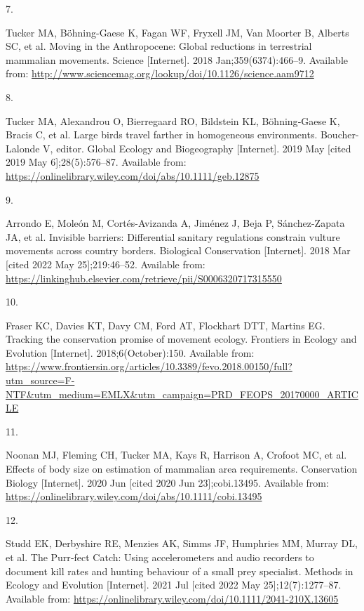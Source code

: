 \documentclass[10pt,a4paper]{article}
\newlength{\cslhangindent}
\newlength{\csllabelwidth}
\newenvironment{CSLReferences}[2] %
{\begin{list}{}{%
	\setlength{\itemindent}{0pt}
	\setlength{\leftmargin}{0pt}
	\setlength{\parsep}{0pt}
	\ifodd #1
	\setlength{\leftmargin}{\cslhangindent}
	\setlength{\itemindent}{-1\cslhangindent}
	\fi
	\setlength{\itemsep}{#2\baselineskip}}}
{\end{list}}
\newcommand{\CSLLeftMargin}[1]{\parbox[t]{\csllabelwidth}{\strut#1\strut}}
\newcommand{\CSLRightInline}[1]{\parbox[t]{\linewidth - \csllabelwidth}{\strut#1\strut}}
\begin{document}
\begin{CSLReferences}{0}{1}
\CSLLeftMargin{7. }%
\CSLRightInline{Tucker MA, Böhning-Gaese K, Fagan WF, Fryxell JM, Van Moorter B, Alberts SC, et al. Moving in the {Anthropocene}: {Global} reductions in terrestrial mammalian movements. Science {[}Internet{]}. 2018 Jan;359(6374):466--9. Available from: \url{http://www.sciencemag.org/lookup/doi/10.1126/science.aam9712}}

\CSLLeftMargin{8. }%
\CSLRightInline{Tucker MA, Alexandrou O, Bierregaard RO, Bildstein KL, Böhning‐Gaese K, Bracis C, et al. Large birds travel farther in homogeneous environments. Boucher-Lalonde V, editor. Global Ecology and Biogeography {[}Internet{]}. 2019 May {[}cited 2019 May 6{]};28(5):576--87. Available from: \url{https://onlinelibrary.wiley.com/doi/abs/10.1111/geb.12875}}

\CSLLeftMargin{9. }%
\CSLRightInline{Arrondo E, Moleón M, Cortés-Avizanda A, Jiménez J, Beja P, Sánchez-Zapata JA, et al. Invisible barriers: {Differential} sanitary regulations constrain vulture movements across country borders. Biological Conservation {[}Internet{]}. 2018 Mar {[}cited 2022 May 25{]};219:46--52. Available from: \url{https://linkinghub.elsevier.com/retrieve/pii/S0006320717315550}}

\CSLLeftMargin{10. }%
\CSLRightInline{Fraser KC, Davies KT, Davy CM, Ford AT, Flockhart DTT, Martins EG. Tracking the conservation promise of movement ecology. Frontiers in Ecology and Evolution {[}Internet{]}. 2018;6(October):150. Available from: \url{https://www.frontiersin.org/articles/10.3389/fevo.2018.00150/full?utm_source=F-NTF&utm_medium=EMLX&utm_campaign=PRD_FEOPS_20170000_ARTICLE}}

\CSLLeftMargin{11. }%
\CSLRightInline{Noonan MJ, Fleming CH, Tucker MA, Kays R, Harrison A, Crofoot MC, et al. Effects of body size on estimation of mammalian area requirements. Conservation Biology {[}Internet{]}. 2020 Jun {[}cited 2020 Jun 23{]};cobi.13495. Available from: \url{https://onlinelibrary.wiley.com/doi/abs/10.1111/cobi.13495}}

\CSLLeftMargin{12. }%
\CSLRightInline{Studd EK, Derbyshire RE, Menzies AK, Simms JF, Humphries MM, Murray DL, et al. The {Purr}‐fect {Catch}: {Using} accelerometers and audio recorders to document kill rates and hunting behaviour of a small prey specialist. Methods in Ecology and Evolution {[}Internet{]}. 2021 Jul {[}cited 2022 May 25{]};12(7):1277--87. Available from: \url{https://onlinelibrary.wiley.com/doi/10.1111/2041-210X.13605}}


\end{CSLReferences}
\end{document}
